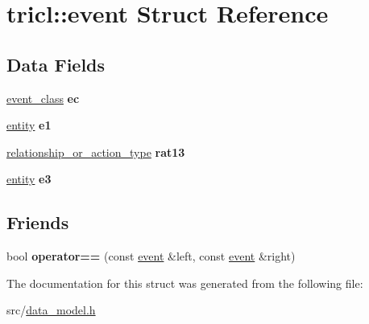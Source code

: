 \hypertarget{structtricl_1_1event}{}\section{tricl\+:\+:event Struct Reference}
\label{structtricl_1_1event}
\subsection*{Data Fields}
\begin{DoxyCompactItemize}
\item 
\mbox{\label{structtricl_1_1event_ab77115c2d4aada8d5c4f51dd6abcaa2a}} 
\hyperlink{data__model_8h_a6967089e2c0837f273d8cb5fd9f7e46d}{event\+\_\+class} {\bfseries ec}
\item 
\mbox{\label{structtricl_1_1event_ae3de57643cd0d42762c1fcbd86bd2632}} 
\hyperlink{data__model_8h_a57273122278e8b301844e2a2e1f0742f}{entity} {\bfseries e1}
\item 
\mbox{\label{structtricl_1_1event_a57d8ec5cf582b4cd2de127590d805325}} 
\hyperlink{data__model_8h_a2d01894944fb58a8fedc0912a48d13f8}{relationship\+\_\+or\+\_\+action\+\_\+type} {\bfseries rat13}
\item 
\mbox{\label{structtricl_1_1event_a49b653bfd4b01a1b561849e8aeadb53d}} 
\hyperlink{data__model_8h_a57273122278e8b301844e2a2e1f0742f}{entity} {\bfseries e3}
\end{DoxyCompactItemize}
\subsection*{Friends}
\begin{DoxyCompactItemize}
\item 
\mbox{\label{structtricl_1_1event_a3dd0c9c41d63a2d2171cffc7dfa14d6c}} 
bool {\bfseries operator==} (const \hyperlink{structtricl_1_1event}{event} \&left, const \hyperlink{structtricl_1_1event}{event} \&right)
\end{DoxyCompactItemize}


The documentation for this struct was generated from the following file\+:\begin{DoxyCompactItemize}
\item 
src/\hyperlink{data__model_8h}{data\+\_\+model.\+h}\end{DoxyCompactItemize}
